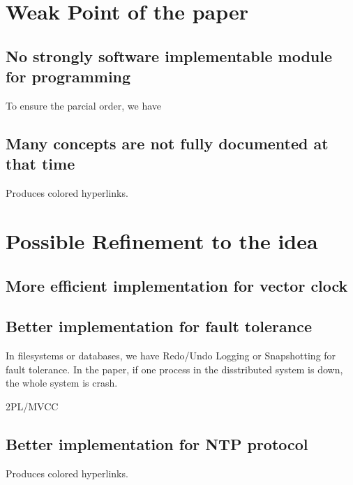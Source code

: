 \documentclass[acmlarge]{acmart}
\begin{document}
\section{Weak Point of the paper}
\subsection {No strongly software implementable module for programming} To ensure the parcial order, we have
\subsection{Many concepts are not fully documented at that time} Produces colored hyperlinks.


\section{Possible Refinement to the idea}
\subsection {More efficient implementation for vector clock}


\subsection {Better implementation for fault tolerance}
In filesystems or databases, we have Redo/Undo Logging or Snapshotting for fault tolerance. In the paper, if one process in the disstributed system is down, the whole system is crash.

2PL/MVCC

\subsection{Better implementation for NTP protocol} Produces colored hyperlinks.\cite{HFT-PTP-NTP} %





\end{document}
